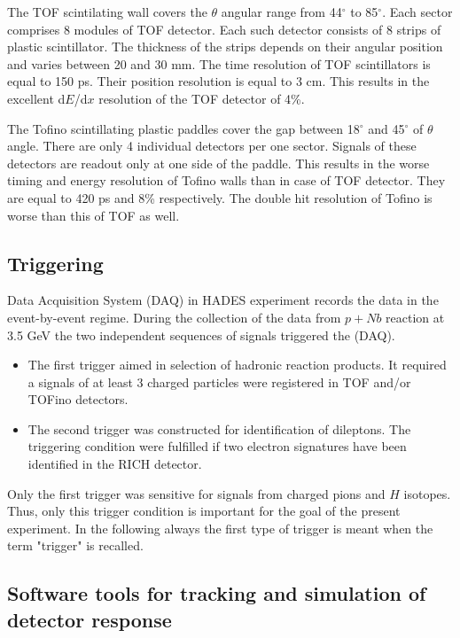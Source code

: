 The TOF scintilating wall covers the $\theta$ angular range from 44$^{\circ}$ to 85$^{\circ}$. 
Each sector comprises 8 modules of TOF detector. Each such detector consists of 8 strips of plastic scintillator. 
The thickness of the strips depends on their angular position and varies between 20 and 30 mm.
The time resolution of TOF scintillators is equal to 150 ps. Their position resolution is equal to 3 cm.
This results in the excellent d$E$/d$x$ resolution of the TOF detector of 4\%.  

The Tofino scintillating plastic paddles cover the gap between 18$^{\circ}$ and 45$^{\circ}$ of $\theta$ angle.
There are only 4 individual detectors per one sector. 
Signals of these detectors are readout only at one side of the paddle. This results 
in the worse timing and energy resolution of Tofino walls than in case of TOF detector. 
They are equal to 420 ps and 8\% respectively.
The double hit resolution of Tofino is worse than this of TOF as well.


\subsection{Triggering}

Data Acquisition System (DAQ) in HADES experiment records the data in the event-by-event regime. 
During the collection of the data from $p+Nb$ reaction at 3.5 GeV the two independent sequences of signals triggered the (DAQ).

\begin{itemize}
\item The first trigger aimed in selection of hadronic reaction products. It required a signals of at least 3 charged particles were registered 
in TOF and/or TOFino detectors.  
\item The second trigger was constructed for identification of dileptons. The triggering condition were fulfilled if two electron signatures have been
identified in the RICH detector.
\end{itemize}

Only the first trigger was sensitive for signals from charged pions and $H$ isotopes. 
Thus, only this trigger condition is important for the goal of the present experiment. 
In the following always the first type of trigger is meant when the term "trigger" is recalled.

\subsection{\label{HGeant_Hydra} Software tools for tracking and simulation of detector response}

